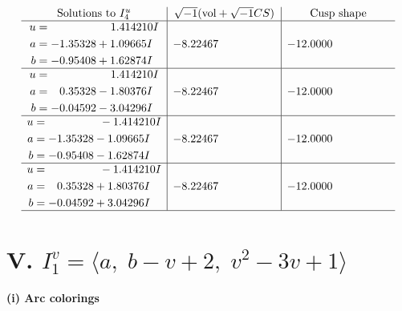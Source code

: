 \documentclass[1p]{elsarticle_modified}
\theoremstyle{definition}
\newcommand{\I}{\sqrt{-1}}
\begin{document}
$$\begin{array}{c|c|c}  
\text{Solutions to }I^u_{4}& \I (\text{vol} + \sqrt{-1}CS) & \text{Cusp shape}\\
 \hline 
\begin{aligned}
u &= \phantom{-0.000000 -}1.414210 I \\
a &= -1.35328 + 1.09665 I \\
b &= -0.95408 + 1.62874 I\end{aligned}
 & -8.22467\phantom{ +0.000000I} & -12.0000\phantom{ +0.000000I} \\ \hline\begin{aligned}
u &= \phantom{-0.000000 -}1.414210 I \\
a &= \phantom{-}0.35328 - 1.80376 I \\
b &= -0.04592 - 3.04296 I\end{aligned}
 & -8.22467\phantom{ +0.000000I} & -12.0000\phantom{ +0.000000I} \\ \hline\begin{aligned}
u &= \phantom{-0.000000 } -1.414210 I \\
a &= -1.35328 - 1.09665 I \\
b &= -0.95408 - 1.62874 I\end{aligned}
 & -8.22467\phantom{ +0.000000I} & -12.0000\phantom{ +0.000000I} \\ \hline\begin{aligned}
u &= \phantom{-0.000000 } -1.414210 I \\
a &= \phantom{-}0.35328 + 1.80376 I \\
b &= -0.04592 + 3.04296 I\end{aligned}
 & -8.22467\phantom{ +0.000000I} & -12.0000\phantom{ +0.000000I}\\
 \hline 
 \end{array}$$\newpage\newpage\renewcommand{\arraystretch}{1}
\centering \section*{V. $I^v_{1}= \langle a,\;b- v+2,\;v^2-3 v+1 \rangle$}
\flushleft \textbf{(i) Arc colorings}\\
\end{document}
